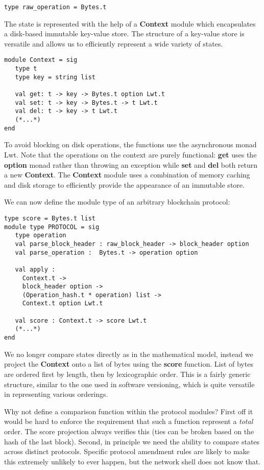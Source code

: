 \documentclass[letterpaper]{article}
\begin{document}
\begin{lstlisting}
type raw_operation = Bytes.t
\end{lstlisting}

The state is represented with the help of a \textbf{Context} module which
encapsulates a disk-based immutable key-value store. The structure of a
key-value store is versatile and allows us to efficiently represent a wide
variety of states.

\begin{lstlisting}
module Context = sig
   type t
   type key = string list

   val get: t -> key -> Bytes.t option Lwt.t
   val set: t -> key -> Bytes.t -> t Lwt.t
   val del: t -> key -> t Lwt.t
   (*...*)
end
\end{lstlisting}

To avoid blocking on disk operations, the functions use the asynchronous monad
Lwt\cite{LWT}. Note that the operations on the context are purely functional:
\textbf{get} uses the \textbf{option} monad rather than throwing an exception
while \textbf{set} and \textbf{del} both return a new \textbf{Context}.
The \textbf{Context} module uses a combination of memory caching and disk
storage to efficiently provide the appearance of an immutable store.

We can now define the module type of an arbitrary blockchain protocol:

\begin{lstlisting}
type score = Bytes.t list
module type PROTOCOL = sig
   type operation
   val parse_block_header : raw_block_header -> block_header option
   val parse_operation :  Bytes.t -> operation option

   val apply :
     Context.t ->
     block_header option ->
     (Operation_hash.t * operation) list ->
     Context.t option Lwt.t

   val score : Context.t -> score Lwt.t
   (*...*)
end
\end{lstlisting}

We no longer compare states directly as in the mathematical model, instead we
project the \textbf{Context} onto a list of bytes using the \textbf{score}
function. List of bytes are ordered first by length, then by
lexicographic order. This is a fairly generic structure, similar to the one used
in software versioning, which is quite versatile in representing various
orderings. 

Why not define a comparison function within the protocol modules? First off it
would be hard to enforce the requirement that such a function represent a
\emph{total} order. The score projection always verifies this (ties can be
broken based on the hash of the last block). Second, in principle we need 
the ability to compare states across distinct protocols. Specific protocol
amendment rules are likely to make this extremely unlikely to ever happen,
but the network shell does not know that.
\end{document}
